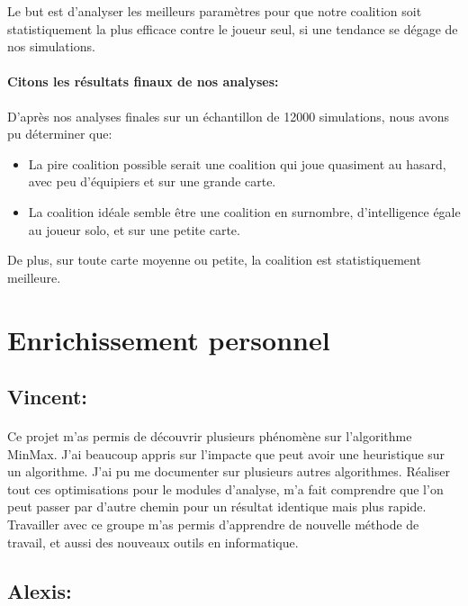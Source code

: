 \documentclass[
	headsepline=on,
	footsepline=on,
	twoside=off,
	abstract=on,
	DIV=10
]{scrreprt}
\begin{document}
			
			\begin{problem}
				Le but est d'analyser les meilleurs paramètres pour que notre coalition soit statistiquement la plus efficace contre le joueur seul, si une tendance se dégage de nos simulations.
			\end{problem}
			
			
			\paragraph{Citons les résultats finaux de nos analyses:}
			
			D'après nos analyses finales sur un échantillon de 12000 simulations, nous avons pu déterminer que:
			
			\begin{itemize}
				\item La pire coalition possible serait une coalition qui joue quasiment au hasard, avec peu d'équipiers et sur une grande carte.
				\item La coalition idéale semble être une coalition en surnombre, d'intelligence égale au joueur solo, et sur une petite carte.
			\end{itemize} 
			
			De plus, sur toute carte moyenne ou petite, la coalition est statistiquement meilleure. 
			
			
									
			\section{Enrichissement personnel}
				\subsection{Vincent: }
				\paragraph{}
				Ce projet m'as permis de découvrir plusieurs phénomène sur l'algorithme MinMax. 
				J'ai beaucoup appris sur l'impacte que peut avoir une heuristique sur un algorithme. 
				J'ai pu me documenter sur plusieurs autres algorithmes. Réaliser tout ces optimisations pour le modules d'analyse, m'a fait comprendre que l'on peut passer par d'autre chemin pour un résultat identique mais plus rapide.
				Travailler avec ce groupe m'as permis d'apprendre de nouvelle méthode de travail, et aussi des nouveaux outils en informatique.
				 
				\subsection{Alexis:} 
\end{document}
